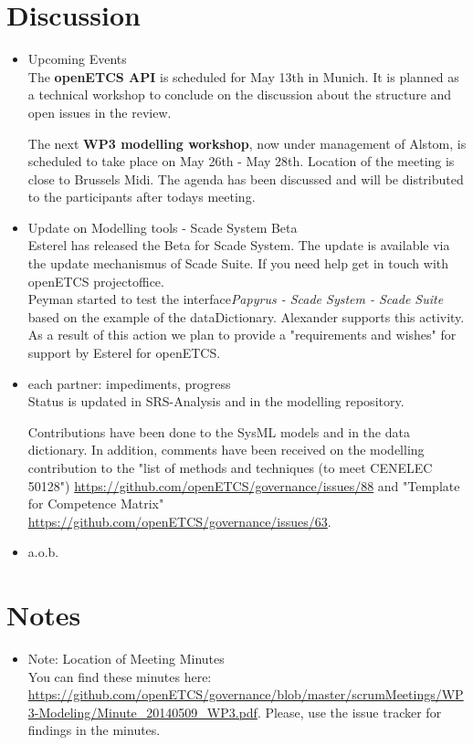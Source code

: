 \documentclass[a4paper, 11pt]{article}
\begin{document}
\section{Discussion}
\begin{itemize}
\item Upcoming Events\\
The \textbf{openETCS API} is scheduled for May 13th in Munich. It is planned as a technical workshop to conclude on the discussion about the structure and open issues in the review.

The next \textbf{WP3 modelling workshop}, now under management of Alstom, is  scheduled to take place on May 26th - May 28th.
Location of the meeting is close to Brussels Midi. The agenda has been discussed and will be distributed to the participants after todays meeting.

\item Update on Modelling tools - Scade System Beta\\
Esterel has released the Beta for Scade System. The update is available via the update mechanismus of Scade Suite. If you need help get in touch with openETCS projectoffice.\\
Peyman started to test the interface\textit{Papyrus - Scade System - Scade Suite} based on the example of the dataDictionary. Alexander supports this activity. As a result of this action we plan to provide a "requirements and wishes" for support by Esterel for openETCS.

\item each partner: impediments, progress\\
Status is updated in SRS-Analysis and in the modelling repository. 

Contributions have been done to the SysML models and in the data dictionary. In addition, comments have been received on the modelling contribution to the "list of methods and techniques (to meet CENELEC 50128") \url{https://github.com/openETCS/governance/issues/88} and "Template for Competence Matrix" \url{https://github.com/openETCS/governance/issues/63}.

\item a.o.b.\\

\end{itemize}

\section{Notes}
\begin{itemize}

\item Note: Location of Meeting Minutes\\
You can find these minutes here: \url{https://github.com/openETCS/governance/blob/master/scrumMeetings/WP3-Modeling/Minute_20140509_WP3.pdf}. Please, use the issue tracker for findings in the minutes.

\end{itemize}
\end{document}
